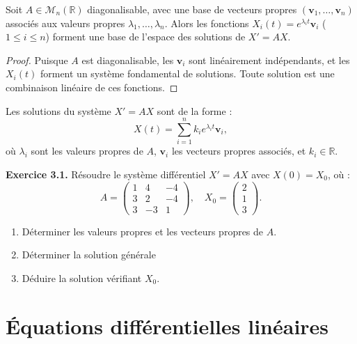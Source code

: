 \begin{theoreme}
	Soit \( A \in \mathcal{M}_n(\mathbb{R}) \) diagonalisable, avec une base de vecteurs propres \( (\mathbf{v}_1, \dots, \mathbf{v}_n) \) associés aux valeurs propres \( \lambda_1, \dots, \lambda_n \). Alors les fonctions \( X_i(t) = e^{\lambda_i t} \mathbf{v}_i \) (\( 1 \leq i \leq n \)) forment une base de l'espace des solutions de \( X' = AX \).
\end{theoreme}
\begin{proof}
	Puisque \( A \) est diagonalisable, les \( \mathbf{v}_i \) sont linéairement indépendants, et les \( X_i(t) \) forment un système fondamental de solutions. Toute solution est une combinaison linéaire de ces fonctions.
\end{proof}

\begin{proposition}
	Les solutions du système \( X' = AX \) sont de la forme :
	\[
	X(t) = \sum_{i=1}^n k_i e^{\lambda_i t} \mathbf{v}_i,
	\]
	où \( \lambda_i \) sont les valeurs propres de \( A \), \( \mathbf{v}_i \) les vecteurs propres associés, et \( k_i \in \mathbb{R} \).
\end{proposition}

\textbf{Exercice 3.1.} Résoudre le système différentiel \( X' = AX \) avec \( X(0) = X_0 \), où :
\[
A = \begin{pmatrix} 1 & 4 & -4 \\ 3 & 2 & -4 \\ 3 & -3 & 1 \end{pmatrix}, \quad X_0 = \begin{pmatrix} 2 \\ 1 \\ 3 \end{pmatrix}.
\]
\begin{enumerate}
	\item Déterminer les valeurs propres et les vecteurs propres de $ A $.
	\item  Déterminer la solution générale
	\item  Déduire la solution vérifiant $ X_{0} $.
\end{enumerate}

\section{Équations différentielles linéaires}

